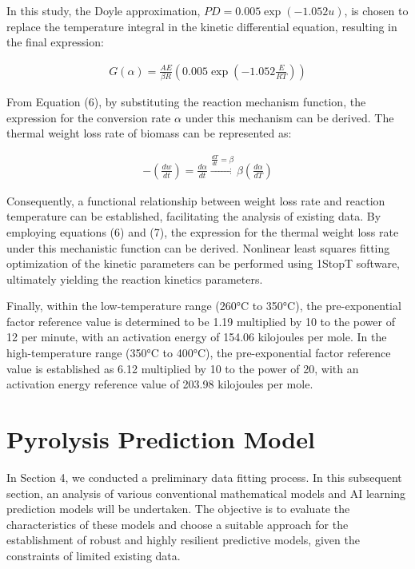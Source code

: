 \documentclass{swmcmthesis}
\begin{document}
In this study, the Doyle approximation, \(PD = 0.005 \exp(-1.052u)\), is chosen to replace the temperature integral in the kinetic differential equation, resulting in the final expression:

\begin{align}
    \label{eq6}
    G(\alpha)=\frac{AE}{\beta R}\left(0.005\exp{\left(-1.052\frac{E}{RT}\right)}\right)
\end{align}

From Equation (6), by substituting the reaction mechanism function, the expression for the conversion rate \( \alpha \) under this mechanism can be derived. The thermal weight loss rate of biomass can be represented as:

\begin{align}
    \label{eq7}
    -(\frac{dw}{dt})=   \frac{d\alpha}{dt} \stackrel{\frac{dT}{dt}=\beta}{\longrightarrow} \beta(\frac{d\alpha}{dT})
\end{align}

Consequently, a functional relationship between weight loss rate and reaction temperature can be established, facilitating the analysis of existing data. By employing equations (6) and (7), the expression for the thermal weight loss rate under this mechanistic function can be derived. Nonlinear least squares fitting optimization of the kinetic parameters can be performed using 1StopT software, ultimately yielding the reaction kinetics parameters.

Finally, within the low-temperature range (260°C to 350°C), the pre-exponential factor reference value is determined to be 1.19 multiplied by 10 to the power of 12 per minute, with an activation energy of 154.06 kilojoules per mole. In the high-temperature range (350°C to 400°C), the pre-exponential factor reference value is established as 6.12 multiplied by 10 to the power of 20, with an activation energy reference value of 203.98 kilojoules per mole.

\section{Pyrolysis Prediction Model}

In Section 4, we conducted a preliminary data fitting process. In this subsequent section, an analysis of various conventional mathematical models and AI learning prediction models will be undertaken. The objective is to evaluate the characteristics of these models and choose a suitable approach for the establishment of robust and highly resilient predictive models, given the constraints of limited existing data.
\end{document}
